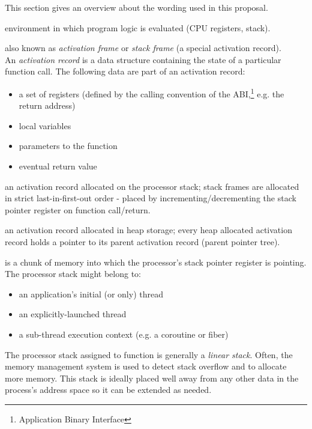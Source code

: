 This section gives an overview about the wording used in this proposal.

environment in which program logic is evaluated (CPU registers, stack).

also known as \emph{activation frame} or \emph{stack frame} (a special
activation record).\\
An \emph{activation record} is a data structure containing the state of a
particular function call. The following data are part of an activation record:
\begin{itemize}
    \item a set of registers (defined by the calling convention of the
        ABI,\footnote{Application Binary Interface} e.g. the return address)
    \item local variables
    \item parameters to the function
    \item eventual return value
\end{itemize}

an activation record allocated on the processor stack; stack frames are
allocated in strict last-in-first-out order - placed by
incrementing/decrementing the stack pointer register on function call/return.

an activation record allocated in heap storage; every heap allocated activation
record holds a pointer to its parent activation record (parent pointer tree).

is a chunk of memory into which the processor's stack pointer register is
pointing. The processor stack might belong to:
\begin{itemize}
    \item an application's initial (or only) thread
    \item an explicitly-launched thread
    \item a sub-thread execution context (e.g. a coroutine or fiber)
\end{itemize}

The processor stack assigned to function \main is generally a \emph{linear
stack}. Often, the memory management system is used to detect stack
overflow and to allocate more memory. This stack is ideally placed well away
from any other data in the process's address space so it can be extended as
needed.

